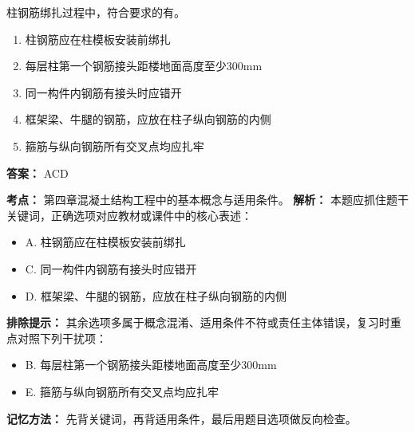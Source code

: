 \documentclass[UTF8,fontset=fandol,11pt]{ctexart}
\begin{document}
\begin{quizbox}[title={第 29 题}]
柱钢筋绑扎过程中，符合要求的有。\\
\begin{enumerate}[label=\Alph*.]
\item 柱钢筋应在柱模板安装前绑扎
\item 每层柱第一个钢筋接头距楼地面高度至少300mm
\item 同一构件内钢筋有接头时应错开
\item 框架梁、牛腿的钢筋，应放在柱子纵向钢筋的内侧
\item 箍筋与纵向钢筋所有交叉点均应扎牢
\end{enumerate}
\textbf{答案：} ACD
\vspace{0.25em}
\begin{answerbox}[title={考点解析}]
\textbf{考点：} 第四章混凝土结构工程中的基本概念与适用条件。
\textbf{解析：} 本题应抓住题干关键词，正确选项对应教材或课件中的核心表述：
\begin{itemize}
\item A. 柱钢筋应在柱模板安装前绑扎
\item C. 同一构件内钢筋有接头时应错开
\item D. 框架梁、牛腿的钢筋，应放在柱子纵向钢筋的内侧
\end{itemize}
\textbf{排除提示：} 其余选项多属于概念混淆、适用条件不符或责任主体错误，复习时重点对照下列干扰项：
\begin{itemize}
\item B. 每层柱第一个钢筋接头距楼地面高度至少300mm
\item E. 箍筋与纵向钢筋所有交叉点均应扎牢
\end{itemize}
\textbf{记忆方法：} 先背关键词，再背适用条件，最后用题目选项做反向检查。
\end{answerbox}
\end{quizbox}

\vspace{0.2em}
\end{document}

